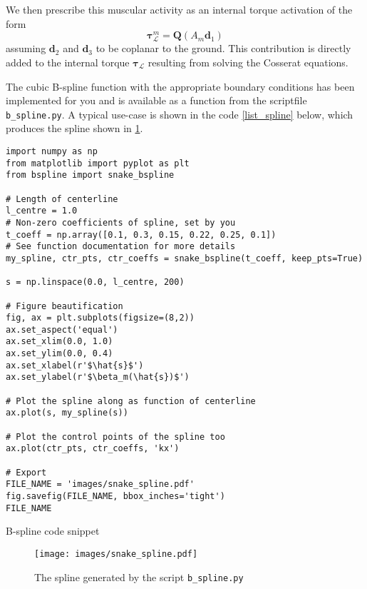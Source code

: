 \documentclass[11pt]{article}
\begin{document}
We then prescribe this muscular activity as an internal torque activation of
the form
\[ \boldsymbol{\tau}^m_{\mathcal{L}} = \mathbf{Q}(A_m\mathbf{d}_1) \]
assuming \(\mathbf{d}_2\) and \(\mathbf{d}_3\) to be coplanar to the ground.
This contribution is directly added to the internal torque
\(\boldsymbol{\tau}_{\mathcal{L}}\) resulting from solving the Cosserat equations.

The cubic B-spline function with the appropriate boundary conditions has
been implemented for you and is available as a function from the scriptfile
\texttt{b\_spline.py}. A typical use-case is shown in the code \cref{list_spline}
below, which produces the spline shown in \cref{python_spline}.


\begin{listing}[htbp]
\begin{verbatim}
import numpy as np
from matplotlib import pyplot as plt
from bspline import snake_bspline

# Length of centerline
l_centre = 1.0
# Non-zero coefficients of spline, set by you
t_coeff = np.array([0.1, 0.3, 0.15, 0.22, 0.25, 0.1])
# See function documentation for more details
my_spline, ctr_pts, ctr_coeffs = snake_bspline(t_coeff, keep_pts=True)

s = np.linspace(0.0, l_centre, 200)

# Figure beautification
fig, ax = plt.subplots(figsize=(8,2))
ax.set_aspect('equal')
ax.set_xlim(0.0, 1.0)
ax.set_ylim(0.0, 0.4)
ax.set_xlabel(r'$\hat{s}$')
ax.set_ylabel(r'$\beta_m(\hat{s})$')

# Plot the spline along as function of centerline
ax.plot(s, my_spline(s))

# Plot the control points of the spline too
ax.plot(ctr_pts, ctr_coeffs, 'kx')

# Export
FILE_NAME = 'images/snake_spline.pdf'
fig.savefig(FILE_NAME, bbox_inches='tight')
FILE_NAME
\end{verbatim}
\caption{\label{list_spline}
B-spline code snippet}
\end{listing}

\begin{figure}[htbp]
\centering
\texttt{[image: images/snake\_spline.pdf]}
\caption{\label{python_spline}
The spline generated by the script \texttt{b\_spline.py}}
\end{figure}
\end{document}
